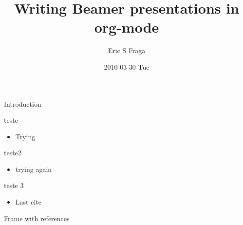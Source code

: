 \documentclass[bigger]{beamer}
\author{Eric S Fraga}
\date{2010-03-30 Tue}
\title{Writing Beamer presentations in org-mode}
\begin{document}
\maketitle

\begin{frame}[label={sec:org6ef5a36}]{Introduction}
\begin{block}{teste}
\begin{itemize}
\item Trying \autocite{mugnaini2021}
\end{itemize}
\end{block}

\begin{block}{teste2}
\begin{itemize}
\item trying again \cite{garfield1955}
\end{itemize}
\end{block}

\begin{block}{teste 3}
\begin{itemize}
\item Last cite \parencite{demeis2003,mingers2015,thompson2015}
\end{itemize}
\end{block}
\end{frame}


\begin{frame}[fragile,allowframebreaks,label=]{Frame with references}
\printbibliography
\end{frame}
\end{document}
